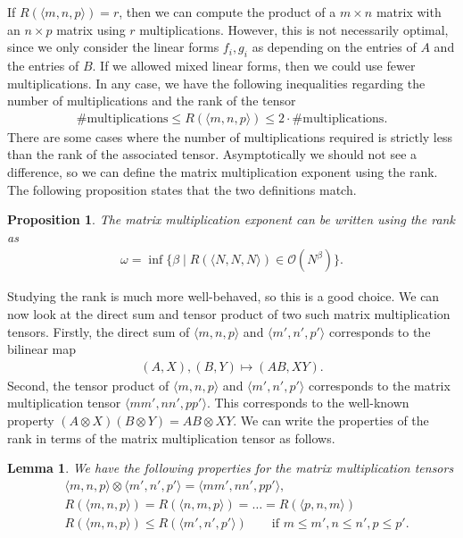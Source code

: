 \documentclass{article}
\theoremstyle{plain}
\newtheorem{proposition}{Proposition}
\newtheorem{lemma}{Lemma}
\theoremstyle{definition}
\theoremstyle{remark}
\begin{document}
If $R(\langle m, n, p \rangle) = r$, then we can compute the product of a $m \times n$ matrix with an $n \times p$ matrix using $r$ multiplications. However, this is not necessarily optimal, since we only consider the linear forms $f_i, g_i$ as depending on the entries of $A$ and the entries of $B$. If we allowed mixed linear forms, then we could use fewer multiplications. In any case, we have the following inequalities regarding the number of multiplications and the rank of the tensor
\begin{align*}
    \# \text{multiplications} \leq R(\langle m, n, p \rangle) \leq 2 \cdot \# \text{multiplications}.
\end{align*}
There are some cases where the number of multiplications required is strictly less than the rank of the associated tensor. Asymptotically we should not see a difference, so we can define the matrix multiplication exponent using the rank. The following proposition states that the two definitions match.

\begin{proposition}\label{prop:omega}
The matrix multiplication exponent can be written using the rank as
\begin{align*}
    \omega = \inf \{ \beta \mid R(\langle N, N, N \rangle) \in \mathcal{O}(N^\beta) \}.
\end{align*}
\end{proposition}

Studying the rank is much more well-behaved, so this is a good choice. We can now look at the direct sum and tensor product of two such matrix multiplication tensors. Firstly, the direct sum of $\langle m, n, p \rangle$ and $\langle m', n', p' \rangle$ corresponds to the bilinear map
\begin{align*}
    (A, X), (B, Y) \mapsto (AB, XY).
\end{align*}
Second, the tensor product of $\langle m, n, p \rangle$ and $\langle m', n', p' \rangle$ corresponds to the matrix multiplication tensor $\langle mm', nn', pp' \rangle$. This corresponds to the well-known property $(A \otimes X)(B \otimes Y) = AB \otimes XY$. We can write the properties of the rank in terms of the matrix multiplication tensor as follows.

\begin{lemma}\label{lem:mat_mul_tensor_rank}
We have the following properties for the matrix multiplication tensors
\begin{align*}
    &\langle m, n, p \rangle \otimes \langle m', n', p' \rangle = \langle mm', nn', pp' \rangle, \\
    &R(\langle m, n, p \rangle) = R(\langle n, m, p \rangle) = \dots = R(\langle p, n, m \rangle) \\
    &R(\langle m, n, p \rangle) \leq R(\langle m', n', p' \rangle) \qquad \text{if } m \leq m', n \leq n', p \leq p'.
\end{align*}
\end{lemma}
\end{document}
